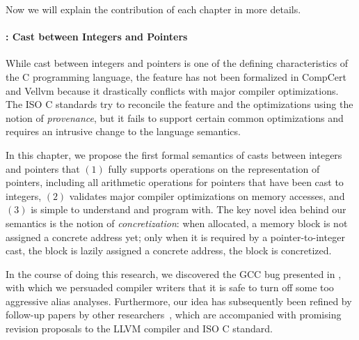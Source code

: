Now we will explain the contribution of each chapter in more details.




\paragraph{: Cast between Integers and Pointers}

While cast between integers and pointers is one of the defining characteristics of the C programming
language, the feature has not been formalized in CompCert and Vellvm because it drastically
conflicts with major compiler optimizations.  The ISO C standards try to reconcile the feature and
the optimizations using the notion of \emph{provenance}, but it fails to support certain common
optimizations and requires an intrusive change to the language semantics.

In this chapter, we propose the first formal semantics of casts between integers and pointers that
$(1)$ fully supports operations on the representation of pointers, including all arithmetic
operations for pointers that have been cast to integers, $(2)$ validates major compiler
optimizations on memory accesses, and $(3)$ is simple to understand and program with.  The key novel
idea behind our semantics is the notion of \emph{concretization}: when allocated, a memory block is
not assigned a concrete address yet; only when it is required by a pointer-to-integer cast, the
block is lazily assigned a concrete address, \ie{} the block is concretized.

In the course of doing this research, we discovered the GCC bug presented in
, with which we persuaded compiler writers that it is safe to turn off
some too aggressive alias analyses.  Furthermore, our idea has subsequently been refined by
follow-up papers by other researchers~\cite{intptrcast-oopsla,intptrcast-popl}, which are
accompanied with promising revision proposals to the LLVM compiler and ISO C standard.


